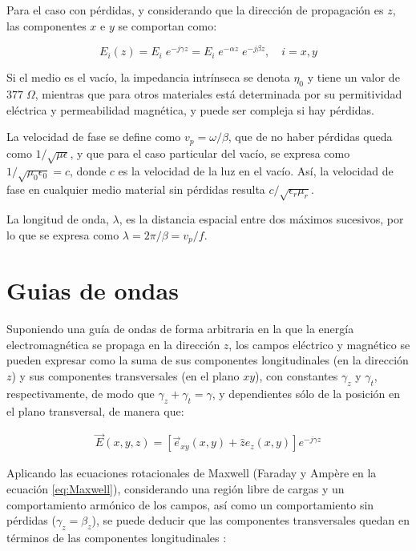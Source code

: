 Para el caso con pérdidas, y considerando que la dirección de propagación es $z$, las componentes $x$ e $y$ se comportan como:

\begin{equation}
E_i(z) = E_i \; e^{-j\gamma z} = E_i \; e^{-\alpha z} \; e^{-j \beta z}, \quad i=x,y \nonumber
\end{equation}

Si el medio es el vacío, la impedancia intrínseca se denota $\eta_0$ y tiene un valor de $377\; \Omega$, mientras que para otros materiales está determinada por su permitividad eléctrica y permeabilidad magnética, y puede ser compleja si hay pérdidas.

La velocidad de fase se define como $v_p=\omega/\beta$, que de no haber pérdidas queda como $1/\sqrt{\mu \epsilon}$, y que para el caso particular del vacío, se expresa como $1/\sqrt{\mu_0 \epsilon_0} = c$, donde $c$ es la velocidad de la luz en el vacío. Así, la velocidad de fase en cualquier medio material sin pérdidas resulta $c/\sqrt{\epsilon_r \mu_r}$.

La longitud de onda, $\lambda$, es la distancia espacial entre dos máximos sucesivos, por lo que se expresa como $\lambda = 2\pi / \beta = v_p/f$.

\section{Guias de ondas}
\label{subsec_guias_de_ondas}

Suponiendo una guía de ondas de forma arbitraria en la que la energía electromagnética se propaga en la dirección $z$, los campos eléctrico y magnético se pueden expresar como la suma de sus componentes longitudinales (en la dirección $z$) y sus componentes transversales (en el plano $xy$), con constantes $\gamma_z$ y $\gamma_t$, respectivamente, de modo que $\gamma_z + \gamma_t = \gamma$, y dependientes sólo de la posición en el plano transversal, de manera que:

\begin{align}
	\vec{E}(x,y,z) = \left[ \vec{e}_{xy}(x,y) + \hat{z} e_z(x,y) \right] e^{-j\gamma z}
\end{align}

Aplicando las ecuaciones rotacionales de Maxwell (Faraday y Ampère en la ecuación \ref{eq:Maxwell}), considerando una región libre de cargas y un comportamiento armónico de los campos, así como un comportamiento sin pérdidas ($\gamma_z = \beta_z$), se puede deducir que las componentes transversales quedan en términos de las componentes longitudinales \cite{Fernandez:Electromag}:

